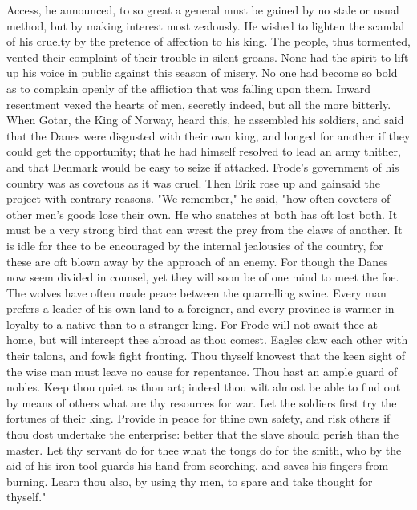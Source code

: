 \documentclass[10pt,a4paper]{report}
\begin{document}
Access, he announced, to so great a general must be gained by no stale or usual method, but by making interest most zealously. He wished to lighten the scandal of his cruelty by the pretence of affection to his king. The people, thus tormented, vented their complaint of their trouble in silent groans. None had the spirit to lift up his voice in public against this season of misery. No one had become so bold as to complain openly of the affliction that was falling upon them. Inward resentment vexed the hearts of men, secretly indeed, but all the more bitterly.\\

When Gotar, the King of Norway, heard this, he assembled his soldiers, and said that the Danes were disgusted with their own king, and longed for another if they could get the opportunity; that he had himself resolved to lead an army thither, and that Denmark would be easy to seize if attacked. Frode's government of his country was as covetous as it was cruel. Then Erik rose up and gainsaid the project with contrary reasons. "We remember," he said, "how often coveters of other men's goods lose their own. He who snatches at both has oft lost both. It must be a very strong bird that can wrest the prey from the claws of another. It is idle for thee to be encouraged by the internal jealousies of the country, for these are oft blown away by the approach of an enemy. For though the Danes now seem divided in counsel, yet they will soon be of one mind to meet the foe. The wolves have often made peace between the quarrelling swine. Every man prefers a leader of his own land to a foreigner, and every province is warmer in loyalty to a native than to a stranger king. For Frode will not await thee at home, but will intercept thee abroad as thou comest. Eagles claw each other with their talons, and fowls fight fronting. Thou thyself knowest that the keen sight of the wise man must leave no cause for repentance. Thou hast an ample guard of nobles. Keep thou quiet as thou art; indeed thou wilt almost be able to find out by means of others what are thy resources for war. Let the soldiers first try the fortunes of their king. Provide in peace for thine own safety, and risk others if thou dost undertake the enterprise: better that the slave should perish than the master. Let thy servant do for thee what the tongs do for the smith, who by the aid of his iron tool guards his hand from scorching, and saves his fingers from burning. Learn thou also, by using thy men, to spare and take thought for thyself."\\
\end{document}
